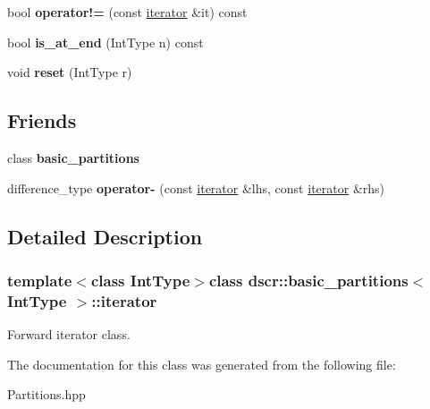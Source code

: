 \begin{DoxyCompactItemize}
\item 
\hypertarget{classdscr_1_1basic__partitions_1_1iterator_a5b89d704e3d35a15749fe492cfeb2e52}{bool {\bfseries operator!=} (const \hyperlink{classdscr_1_1basic__partitions_1_1iterator}{iterator} \&it) const }\label{classdscr_1_1basic__partitions_1_1iterator_a5b89d704e3d35a15749fe492cfeb2e52}

\item 
\hypertarget{classdscr_1_1basic__partitions_1_1iterator_aaf3597c6f8c95ec719a22a457699a01f}{bool {\bfseries is\-\_\-at\-\_\-end} (Int\-Type n) const }\label{classdscr_1_1basic__partitions_1_1iterator_aaf3597c6f8c95ec719a22a457699a01f}

\item 
\hypertarget{classdscr_1_1basic__partitions_1_1iterator_ad0eb141f776dd7f604904d2943f2fe9e}{void {\bfseries reset} (Int\-Type r)}\label{classdscr_1_1basic__partitions_1_1iterator_ad0eb141f776dd7f604904d2943f2fe9e}

\end{DoxyCompactItemize}
\subsection*{Friends}
\begin{DoxyCompactItemize}
\item 
\hypertarget{classdscr_1_1basic__partitions_1_1iterator_aa61a5712b0e94d9ea6b10b06e861e942}{class {\bfseries basic\-\_\-partitions}}\label{classdscr_1_1basic__partitions_1_1iterator_aa61a5712b0e94d9ea6b10b06e861e942}

\item 
\hypertarget{classdscr_1_1basic__partitions_1_1iterator_a4304f5d7bb1d12de2d2ad2c1e4e64dab}{difference\-\_\-type {\bfseries operator-\/} (const \hyperlink{classdscr_1_1basic__partitions_1_1iterator}{iterator} \&lhs, const \hyperlink{classdscr_1_1basic__partitions_1_1iterator}{iterator} \&rhs)}\label{classdscr_1_1basic__partitions_1_1iterator_a4304f5d7bb1d12de2d2ad2c1e4e64dab}

\end{DoxyCompactItemize}


\subsection{Detailed Description}
\subsubsection*{template$<$class Int\-Type$>$class dscr\-::basic\-\_\-partitions$<$ Int\-Type $>$\-::iterator}

Forward iterator class. 

The documentation for this class was generated from the following file\-:\begin{DoxyCompactItemize}
\item 
Partitions.\-hpp\end{DoxyCompactItemize}
